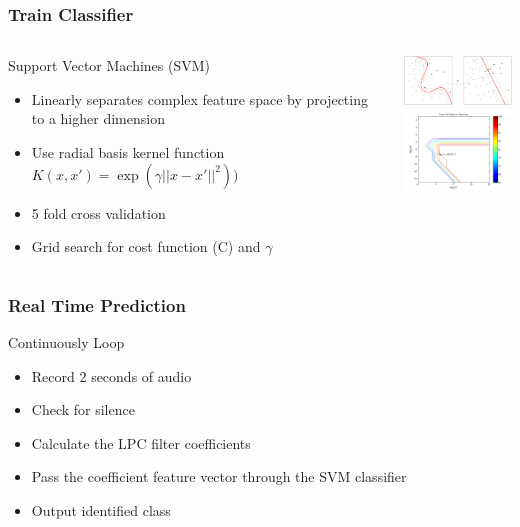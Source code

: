 \documentclass{beamer}
\begin{document}
\begin{frame}
\frametitle{Train Classifier}
\begin{columns}[c]
  \column{2.5in}
  	\begin{block}{Support Vector Machines (SVM)}
	\begin{itemize}
	\item Linearly separates complex feature space by projecting to a higher dimension
	\item Use radial basis kernel function $K(x, x') = \exp(\gamma||x-x'||^2))$
	\item 5 fold cross validation
	\item Grid search for cost function (C) and $\gamma$
	\end{itemize}
	\end{block}
  \column{1.5in}
	\includegraphics[width=1.5in]{images/svm.png}
	\\
	\includegraphics[width=1.5in]{images/grid.png}
\end{columns}
\end{frame}


\begin{frame}
\frametitle{Real Time Prediction}
  	\begin{block}{Continuously Loop}
	\begin{itemize}
	\item Record 2 seconds of audio
	\item Check for silence
	\item Calculate the LPC filter coefficients
	\item Pass the coefficient feature vector through the SVM classifier
	\item Output identified class
	\end{itemize}
	\end{block}
\end{frame}

\end{document}
